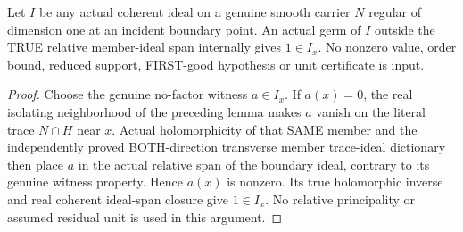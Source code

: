 \begin{lemma}
\label{hir:sharp-actual-curve-no-factor-member-unit}
\leanok
Let $I$ be any actual coherent ideal on a genuine smooth carrier $N$
regular of dimension one at an incident boundary point. An actual germ
of $I$ outside the TRUE relative member-ideal span internally gives
$1\in I_x$. No nonzero value, order bound, reduced support, FIRST-good
hypothesis or unit certificate is input.
\end{lemma}
\begin{proof}
Choose the genuine no-factor witness $a\in I_x$. If $a(x)=0$, the real
isolating neighborhood of the preceding lemma makes $a$ vanish on the
literal trace $N\cap H$ near $x$. Actual holomorphicity of that SAME
member and the independently proved BOTH-direction transverse member
trace-ideal dictionary then place $a$ in the actual relative span of the
boundary ideal, contrary to its genuine witness property. Hence $a(x)$
is nonzero. Its true holomorphic inverse and real coherent ideal-span
closure give $1\in I_x$. No relative principality or assumed residual
unit is used in this argument.
\end{proof}

